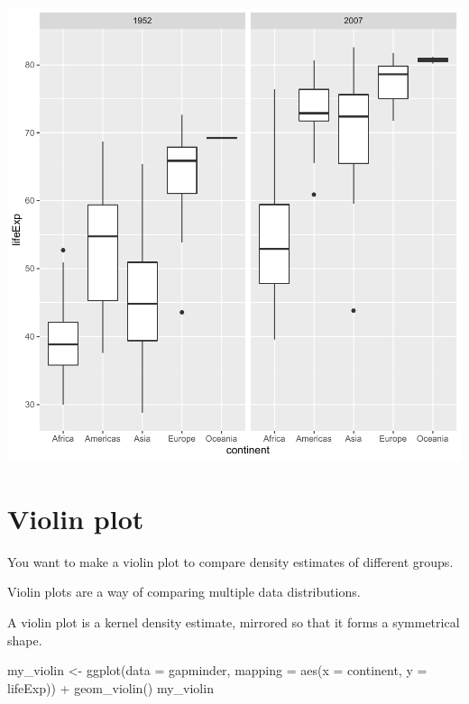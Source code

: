 \documentclass[
]{book}
\makeatletter
\newenvironment{Shaded}{\begin{snugshade}}{\end{snugshade}}
\newcommand{\AttributeTok}[1]{\textcolor[rgb]{0.61,0.61,0.61}{#1}}
\newcommand{\FunctionTok}[1]{\textcolor[rgb]{0,0,0}{#1}}
\newcommand{\NormalTok}[1]{#1}
\newcommand{\OtherTok}[1]{\textcolor[rgb]{0.37,0.37,0.37}{#1}}
\newcommand{\SpecialCharTok}[1]{\textcolor[rgb]{0,0,0}{#1}}
\newenvironment{kframe}{%
\medskip{}
\setlength{\fboxsep}{.8em}
 \def\at@end@of@kframe{}%
 \ifinner\ifhmode%
  \def\at@end@of@kframe{\end{minipage}}%
  \begin{minipage}{\columnwidth}%
 \fi\fi%
 \def\FrameCommand##1{\hskip\@totalleftmargin \hskip-\fboxsep
 \colorbox{shadecolor}{##1}\hskip-\fboxsep
     \hskip-\linewidth \hskip-\@totalleftmargin \hskip\columnwidth}%
 \MakeFramed {\advance\hsize-\width
   \@totalleftmargin\z@ \linewidth\hsize
   \@setminipage}}%
 {\par\unskip\endMakeFramed%
 \at@end@of@kframe}
\renewenvironment{Shaded}{\begin{kframe}}{\end{kframe}}
\makeatother
\begin{document}
\begin{center}\includegraphics[width=0.7\linewidth,keepaspectratio]{Multivariable_Data_Analysis_files/figure-latex/unnamed-chunk-85-1} \end{center}

\hypertarget{violin-plot}{%
\section{Violin plot}\label{violin-plot}}

You want to make a violin plot to compare density estimates of different groups.

Violin plots are a way of comparing multiple data distributions.

A violin plot is a kernel density estimate, mirrored so that it forms a symmetrical shape.

\begin{Shaded}
\begin{Highlighting}[]
\NormalTok{my\_violin }\OtherTok{\textless{}{-}} \FunctionTok{ggplot}\NormalTok{(}\AttributeTok{data =}\NormalTok{ gapminder, }\AttributeTok{mapping =} \FunctionTok{aes}\NormalTok{(}\AttributeTok{x =}\NormalTok{ continent, }\AttributeTok{y =}\NormalTok{ lifeExp)) }\SpecialCharTok{+}
  \FunctionTok{geom\_violin}\NormalTok{() }
\NormalTok{my\_violin}
\end{Highlighting}
\end{Shaded}
\end{document}
